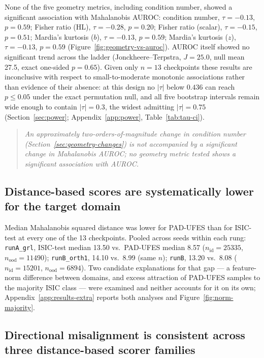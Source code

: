 None of the five geometry metrics, including condition number, showed a significant association with Mahalanobis AUROC: condition number, $\tau = -0.13$, $p = 0.59$; Fisher ratio (HL), $\tau = -0.28$, $p = 0.20$; Fisher ratio (scalar), $\tau = -0.15$, $p = 0.51$; Mardia's kurtosis ($b$), $\tau = -0.13$, $p = 0.59$; Mardia's kurtosis ($z$), $\tau = -0.13$, $p = 0.59$ (Figure~\ref{fig:geometry-vs-auroc}). AUROC itself showed no significant trend across the ladder (Jonckheere--Terpstra, $J = 25.0$, null mean 27.5, exact one-sided $p = 0.65$). Given only $n = 13$ checkpoints these results are inconclusive with respect to small-to-moderate monotonic associations rather than evidence of their absence: at this design no $|\tau|$ below $0.436$ can reach $p \leq 0.05$ under the exact permutation null, and all five bootstrap intervals remain wide enough to contain $|\tau| = 0.3$, the widest admitting $|\tau| = 0.75$ (Section~\ref{sec:power}; Appendix~\ref{app:power}, Table~\ref{tab:tau-ci}).

\begin{quote}
\emph{An approximately two-orders-of-magnitude change in condition number (Section~\ref{sec:geometry-changes}) is not accompanied by a significant change in Mahalanobis AUROC; no geometry metric tested shows a significant association with AUROC.}
\end{quote}

\subsection{Distance-based scores are systematically lower for the target domain}
\label{sec:systematic-lower}

Median Mahalanobis squared distance was lower for PAD-UFES than for ISIC-test at every one of the 13 checkpoints. Pooled across seeds within each rung: \texttt{runA\_grl}, ISIC-test median 13.50 vs.\ PAD-UFES median 8.57 ($n_{\mathrm{id}} = 25335$, $n_{\mathrm{ood}} = 11490$); \texttt{runB\_orth1}, 14.10 vs.\ 8.99 (same $n$); \texttt{runB}, 13.20 vs.\ 8.08 ($n_{\mathrm{id}} = 15201$, $n_{\mathrm{ood}} = 6894$). Two candidate explanations for that gap --- a feature-norm difference between domains, and excess attraction of PAD-UFES samples to the majority ISIC class --- were examined and neither accounts for it on its own; Appendix~\ref{app:results-extra} reports both analyses and Figure~\ref{fig:norm-majority}.

\subsection{Directional misalignment is consistent across three distance-based scorer families}
\label{sec:generalizes}

